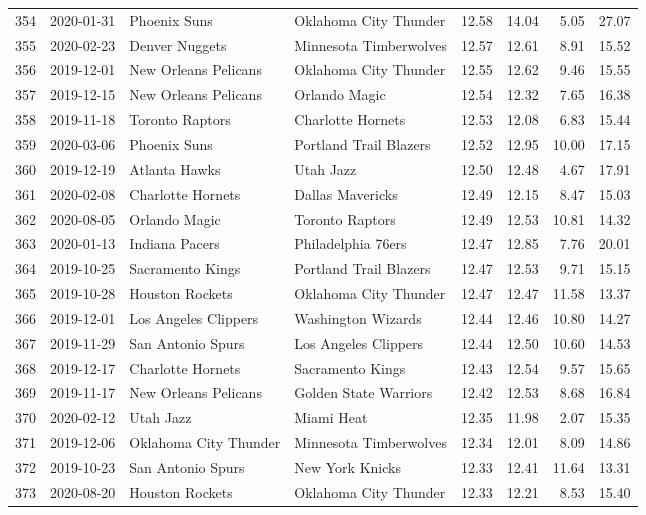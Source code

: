 \documentclass[
  11pt,
]{article}
\theoremstyle{nonumberplain}
\begin{document}
\begin{longtable}{rl|llr|rrr}
354 & 2020-01-31 & Phoenix Suns & Oklahoma City Thunder & 12.58 & 14.04 & 5.05 & 27.07\\
355 & 2020-02-23 & Denver Nuggets & Minnesota Timberwolves & 12.57 & 12.61 & 8.91 & 15.52\\
356 & 2019-12-01 & New Orleans Pelicans & Oklahoma City Thunder & 12.55 & 12.62 & 9.46 & 15.55\\
357 & 2019-12-15 & New Orleans Pelicans & Orlando Magic & 12.54 & 12.32 & 7.65 & 16.38\\
358 & 2019-11-18 & Toronto Raptors & Charlotte Hornets & 12.53 & 12.08 & 6.83 & 15.44\\
359 & 2020-03-06 & Phoenix Suns & Portland Trail Blazers & 12.52 & 12.95 & 10.00 & 17.15\\
360 & 2019-12-19 & Atlanta Hawks & Utah Jazz & 12.50 & 12.48 & 4.67 & 17.91\\
361 & 2020-02-08 & Charlotte Hornets & Dallas Mavericks & 12.49 & 12.15 & 8.47 & 15.03\\
362 & 2020-08-05 & Orlando Magic & Toronto Raptors & 12.49 & 12.53 & 10.81 & 14.32\\
363 & 2020-01-13 & Indiana Pacers & Philadelphia 76ers & 12.47 & 12.85 & 7.76 & 20.01\\
364 & 2019-10-25 & Sacramento Kings & Portland Trail Blazers & 12.47 & 12.53 & 9.71 & 15.15\\
365 & 2019-10-28 & Houston Rockets & Oklahoma City Thunder & 12.47 & 12.47 & 11.58 & 13.37\\
366 & 2019-12-01 & Los Angeles Clippers & Washington Wizards & 12.44 & 12.46 & 10.80 & 14.27\\
367 & 2019-11-29 & San Antonio Spurs & Los Angeles Clippers & 12.44 & 12.50 & 10.60 & 14.53\\
368 & 2019-12-17 & Charlotte Hornets & Sacramento Kings & 12.43 & 12.54 & 9.57 & 15.65\\
369 & 2019-11-17 & New Orleans Pelicans & Golden State Warriors & 12.42 & 12.53 & 8.68 & 16.84\\
370 & 2020-02-12 & Utah Jazz & Miami Heat & 12.35 & 11.98 & 2.07 & 15.35\\
371 & 2019-12-06 & Oklahoma City Thunder & Minnesota Timberwolves & 12.34 & 12.01 & 8.09 & 14.86\\
372 & 2019-10-23 & San Antonio Spurs & New York Knicks & 12.33 & 12.41 & 11.64 & 13.31\\
373 & 2020-08-20 & Houston Rockets & Oklahoma City Thunder & 12.33 & 12.21 & 8.53 & 15.40\\

\end{longtable}
\end{document}

